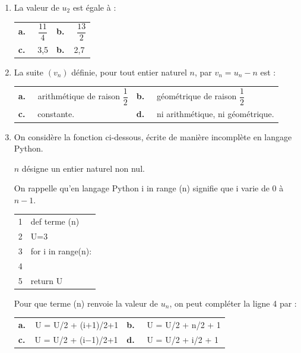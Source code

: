 \begin{enumerate}
\item La valeur de $u_2$ est égale à :

\begin{center}
\begin{tabularx}{\linewidth}{*{2}{X}}
\textbf{a.~~} $\dfrac{11}{4}$& \textbf{b.~~} $\dfrac{13}{2}$\\
\textbf{c.~~} 3,5&\textbf{b.~~}2,7
\end{tabularx}
\end{center}

\item La suite $\left(v_n\right)$ définie, pour tout entier naturel $n$, par $v_n = u_n - n$ est :

\begin{center}
\begin{tabularx}{\linewidth}{*{2}{X}}
\textbf{a.~~} arithmétique de raison $\dfrac12$&\textbf{b.~~} géométrique de raison $\dfrac12$\\
\textbf{c.~~}  constante. &\textbf{d.~~}  ni arithmétique, ni géométrique.
\end{tabularx}
\end{center}

\item On considère la fonction ci-dessous, écrite de manière incomplète en langage Python.

\begin{minipage}{0.58\linewidth}
$n$ désigne un entier naturel non nul. 

On rappelle qu'en langage Python
\og i in range (n)\fg{} signifie que i varie de 0 à $n-1$.
\end{minipage}\hfill
\begin{minipage}{0.38\linewidth}
\begin{tabular}{|c|l|}\hline
1&def terme (n)\\
2&\qquad U=3\\
3&\qquad for i in range(n): \\
4& \dotfill \\
5&\qquad return U\\ \hline
\end{tabular}
\end{minipage}

Pour que terme (n) renvoie la valeur de $u_n$, on peut compléter la ligne 4 par : 

\begin{center}
\begin{tabularx}{\linewidth}{*{2}{X}}
\textbf{a.~~}U = U/2 + (i$+$1)/2+1	&\textbf{b.~~} U = U/2 + n/2 + 1\\
\textbf{c.~~}U = U/2 + (i$-$1)/2+1 	&\textbf{d.~~} U = U/2 + i/2 + 1
\end{tabularx}
\end{center}
\end{enumerate}

